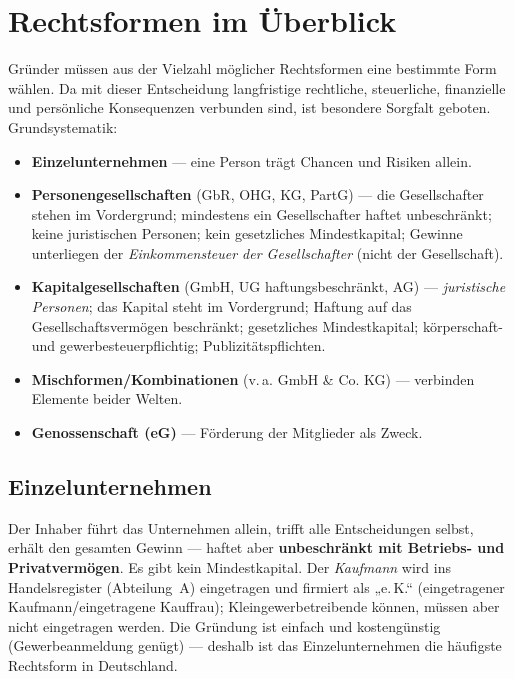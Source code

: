 \documentclass[11pt, a4paper]{article}
\begin{document}
\section{Rechtsformen im Überblick}

Gründer müssen aus der Vielzahl möglicher Rechtsformen eine bestimmte Form wählen. Da mit
dieser Entscheidung langfristige rechtliche, steuerliche, finanzielle und persönliche
Konsequenzen verbunden sind, ist besondere Sorgfalt geboten. Grundsystematik:

\begin{itemize}
  \item \textbf{Einzelunternehmen} --- eine Person trägt Chancen und Risiken allein.
  \item \textbf{Personengesellschaften} (GbR, OHG, KG, PartG) --- die Gesellschafter
    stehen im Vordergrund; mindestens ein Gesellschafter haftet unbeschränkt; keine
    juristischen Personen; kein gesetzliches Mindestkapital; Gewinne unterliegen der
    \emph{Einkommensteuer der Gesellschafter} (nicht der Gesellschaft).
  \item \textbf{Kapitalgesellschaften} (GmbH, UG haftungsbeschränkt, AG) ---
    \emph{juristische Personen}; das Kapital steht im Vordergrund; Haftung auf das
    Gesellschaftsvermögen beschränkt; gesetzliches Mindestkapital; körperschaft- und
    gewerbesteuerpflichtig; Publizitätspflichten.
  \item \textbf{Mischformen/Kombinationen} (v.\,a. GmbH \& Co. KG) --- verbinden Elemente
    beider Welten.
  \item \textbf{Genossenschaft (eG)} --- Förderung der Mitglieder als Zweck.
\end{itemize}

\subsection{Einzelunternehmen}

Der Inhaber führt das Unternehmen allein, trifft alle Entscheidungen selbst, erhält den
gesamten Gewinn --- haftet aber \textbf{unbeschränkt mit Betriebs- und Privatvermögen}.
Es gibt kein Mindestkapital. Der \emph{Kaufmann} wird ins Handelsregister (Abteilung~A)
eingetragen und firmiert als „e.\,K.`` (eingetragener Kaufmann/eingetragene Kauffrau);
Kleingewerbetreibende können, müssen aber nicht eingetragen werden. Die Gründung ist
einfach und kostengünstig (Gewerbeanmeldung genügt) --- deshalb ist das Einzelunternehmen
die häufigste Rechtsform in Deutschland.
\end{document}
